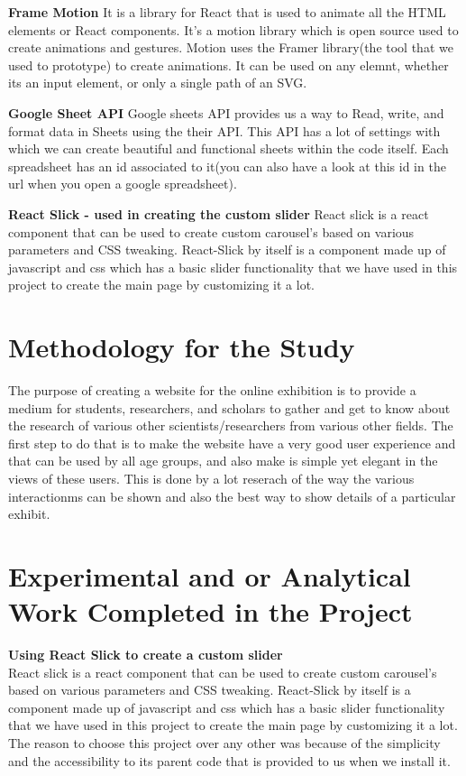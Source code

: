 \textbf{ Frame Motion }
It is a library for React that is used to animate all the HTML elements or React components. It's a motion library which is open source used to create animations and gestures. Motion uses the Framer library(the tool that we used to prototype) to create animations. It can be used on any elemnt, whether its an input element, or only a single path of an SVG.

\textbf{Google Sheet API}
Google sheets API provides us a way to Read, write, and format data in Sheets using the their API. This API has a lot of settings with which we can create beautiful and functional sheets within the code itself. Each spreadsheet has an id associated to it(you can also have a look at this id in the url when you open a google spreadsheet).

\textbf{React Slick - used in creating the custom slider}
React slick is a react component that can be used to create custom carousel's based on various parameters and CSS tweaking. React-Slick by itself is a component made up of javascript and css which has a basic slider functionality that we have used in this project to create the main page by customizing it a lot.




\section{Methodology for the Study}

The purpose of creating a website for the online exhibition is to provide a medium for students, researchers, and scholars to gather and get to know about the research of various other scientists/researchers from various other fields. The first step to do that is to make the website have a very good user experience and that can be used by all age groups, and also make is simple yet elegant in the views of these users. This is done by a lot reserach of the way the various interactionms can be shown and also the best way to show details of a particular exhibit. 

\section{Experimental and or Analytical Work Completed in the Project}

\textbf{Using React Slick to create a custom slider}
\\
React slick is a react component that can be used to create custom carousel's based on various parameters and CSS tweaking. React-Slick by itself is a component made up of javascript and css which has a basic slider functionality that we have used in this project to create the main page by customizing it a lot. The reason to choose this project over any other was because of the simplicity and the accessibility to its parent code that is provided to us when we install it. 

